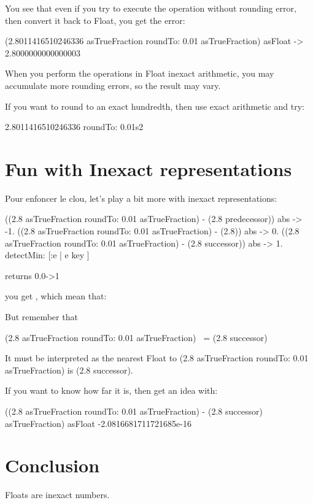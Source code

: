 \documentclass[a4paper,10pt,twoside]{book}
\begin{document}
You see that even if you try to execute the operation without rounding
error, then convert it back to Float, you get the error:

\begin{code}{}
(2.8011416510246336 asTrueFraction roundTo: 0.01 asTrueFraction) asFloat
->  2.8000000000000003
\end{code}

When you perform the  operations in Float inexact arithmetic,
you may accumulate more rounding errors, so the result may vary.

If you want to round to an exact hundredth, then use exact arithmetic and try:

\begin{code}{}
  2.8011416510246336 roundTo: 0.01s2
\end{code}





\section{Fun with Inexact representations}
Pour enfoncer le clou, let's play a bit more with inexact representations:

\begin{code}{}
{
((2.8 asTrueFraction roundTo: 0.01 asTrueFraction) - (2.8
predecessor)) abs -> -1.
((2.8 asTrueFraction roundTo: 0.01 asTrueFraction) - (2.8)) abs -> 0.
((2.8 asTrueFraction roundTo: 0.01 asTrueFraction) - (2.8 successor)) abs -> 1.
} detectMin: [:e | e key ]

returns
	0.0->1
\end{code}

you get , which mean that:

But remember that 

\begin{code}{}
(2.8 asTrueFraction roundTo: 0.01 asTrueFraction) ~= (2.8 successor)
\end{code}

It must be interpreted as the nearest Float to (2.8 asTrueFraction
roundTo: 0.01 asTrueFraction) is (2.8 successor).

If you want to know how far it is, then get an idea with:

\begin{code}{}
((2.8 asTrueFraction roundTo: 0.01 asTrueFraction) - (2.8 successor)
asTrueFraction) asFloat
-2.0816681711721685e-16
\end{code}



\section{Conclusion}
Floats are inexact numbers. 


\ifx\wholebook\relax\else
   
   
\end{document}

